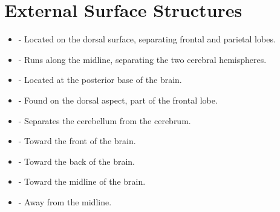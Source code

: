 \section*{External Surface Structures}
\begin{itemize}
    \item {} - Located on the dorsal surface, separating frontal and parietal lobes.
    \item {} - Runs along the midline, separating the two cerebral hemispheres.
    \item {} - Located at the posterior base of the brain.
    \item {} - Found on the dorsal aspect, part of the frontal lobe.
    \item {} - Separates the cerebellum from the cerebrum.
    \item {} - Toward the front of the brain.
    \item {} - Toward the back of the brain.
    \item {} - Toward the midline of the brain.
    \item {} - Away from the midline.
\end{itemize}

